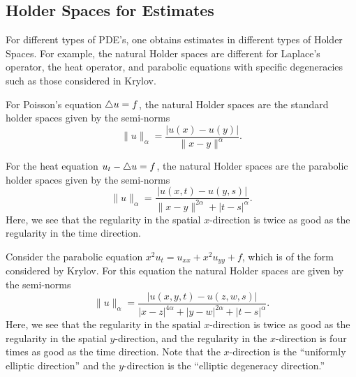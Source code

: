 
\subsection{Holder Spaces for Estimates}

For different types of PDE's, one obtains estimates in different types of Holder Spaces. For example, the natural Holder spaces are different for Laplace's operator, the heat operator, and parabolic equations with specific degeneracies such as those considered in Krylov\cite{krylov}.

For Poisson's equation $\triangle u = f$, the natural Holder spaces are the standard holder spaces given by the semi-norms
\begin{equation}
\|u\|_\alpha = \frac{|u(x) - u(y)|}{\|x - y\|^\alpha}.
\end{equation}

For the heat equation $u_t - \triangle u = f$, the natural Holder spaces are the parabolic holder spaces given by the semi-norms
\begin{equation}
\|u\|_\alpha = \frac{|u(x,t) - u(y,s)| }{\|x-y\|^{2\alpha} + |t-s|^\alpha}.
\end{equation}
Here, we see that the regularity in the spatial $x$-direction is twice as good as the regularity in the time direction.

Consider the parabolic equation $x^2 u_t = u_{xx} + x^2 u_{yy} + f$, which is of the form considered by Krylov\cite{krylov}. For this equation the natural Holder spaces are given by the semi-norms
\begin{equation}
\|u\|_\alpha = \frac{|u(x,y,t) - u(z,w,s)|}{|x-z|^{4\alpha}+|y-w|^{2\alpha}+|t-s|^\alpha}.
\end{equation}
Here, we see that the regularity in the spatial $x$-direction is twice as good as the regularity in the spatial $y$-direction, and the regularity in the $x$-direction is four times as good as the time direction. Note that the $x$-direction is the ``uniformly elliptic direction'' and the $y$-direction is the ``elliptic degeneracy direction.''

